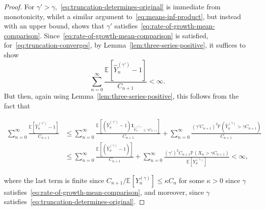 \documentclass[12pt]{article}
\theoremstyle{definition}
\newcommand{\E}[2][]{\ensuremath{\mathbb{E}_{#1}\left[#2 \right]}}
\newcommand{\Prob}[2][]{\ensuremath{\mathbb{P}_{#1} \left(#2 \right)}}
\begin{document}
\begin{proof}
For $\gamma' > \gamma$,~\eqref{eq:truncation-determines-original} is immediate from monotonicity, whilst a similar argument to~\eqref{eq:means-inf-product}, but instead with an upper bound, shows that $\gamma'$ satisfies~\eqref{eq:rate-of-growth-mean-comparison}. Since~\eqref{eq:rate-of-growth-mean-comparison} is satisfied, for~\eqref{eq:truncation-converges}, by Lemma~\ref{lem:three-series-positive}, it suffices to show
\[
\sum_{n=0}^{\infty} \frac{\E{\widehat{Y}^{(\gamma')}_{n} - 1}}{C_{n+1}} < \infty. 
\]
But then, again using Lemma~\ref{lem:three-series-positive}, this follows from the fact that 
\begin{linenomath}
\begin{align*}
\sum_{n=0}^{\infty} \frac{\E{\widehat{Y}^{(\gamma')}_{n} - 1}}{C_{n+1}} & \leq \sum_{n=0}^{\infty} \frac{\E{\left(\widehat{Y}^{(\gamma')}_{n} - 1\right)\mathbf{1}_{\widehat{Y}^{(\gamma')}_{n} \leq \gamma C_{n+1}}}}{C_{n+1}} + \sum_{n=0}^{\infty} \frac{(\gamma' C_{n+1})^2 \Prob{\widehat{Y}^{(\gamma)}_{n} > \gamma C_{n+1}}}{C_{n+1}}
\\ & \leq \sum_{n=0}^{\infty} \frac{\E{\left(\widehat{Y}^{(\gamma)}_{n} - 1\right)}}{C_{n+1}} + \sum_{n=0}^{\infty} \frac{(\gamma')^2 C_{n+1} \Prob{X_{n} > \gamma C_{n+1}}}{\E{Y^{(\gamma)}_{n}}} < \infty,
\end{align*}
\end{linenomath}
where the last term is finite since $C_{n+1}/\E{Y^{(\gamma)}_{n}} \leq \kappa C_{n}$ for some $\kappa > 0$ since $\gamma$ satisfies~\eqref{eq:rate-of-growth-mean-comparison}, and moreover, since $\gamma$ satisfies~\eqref{eq:truncation-determines-original}. 
\end{proof}
\end{document}
